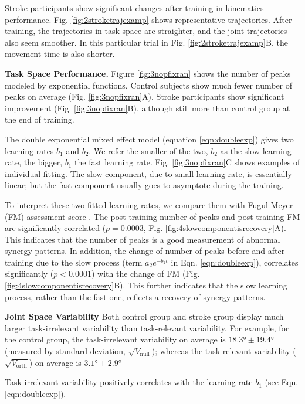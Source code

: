 Stroke participants show significant changes after training in kinematics performance.
Fig. \ref{fig:2stroketrajexamp} shows representative trajectories. After training, the trajectories in task space are straighter, and the joint trajectories also seem smoother. In this particular trial in Fig. \ref{fig:2stroketrajexamp}B, the movement time is also shorter.

\textbf{Task Space Performance.}
Figure \ref{fig:3nopfixran} shows the number of peaks modeled by exponential functions.
Control subjects show much fewer number of peaks on average (Fig. \ref{fig:3nopfixran}A).
Stroke participants show significant improvement (Fig. \ref{fig:3nopfixran}B), although still more than control group at the end of training.

The double exponential mixed effect model (equation \ref{eqn:doubleexp}) gives two learning rates $ b_1 $ and $ b_2 $. 
We refer the smaller of the two, $ b_2 $ as the slow learning rate, the bigger, $ b_1 $ the fast learning rate.
Fig. \ref{fig:3nopfixran}C shows examples of individual fitting.
The slow component, due to small learning rate, is essentially linear; but the fast component usually goes to asymptote during the training.

To interpret these two fitted learning rates, we compare them with Fugul Meyer (FM) assessment score \cite{}.
The post training number of peaks and post training FM are significantly correlated ($ p = 0.0003 $, Fig. \ref{fig:4slowcomponentisrecovery}A).
This indicates that the number of peaks is a good measurement of abnormal synergy patterns.
In addition, the change of number of peaks before and after training due to the slow process (term $ a_2e^{-b_2t} $ in Eqn. \ref{eqn:doubleexp}), correlates significantly ($ p<0.0001 $) with the change of FM (Fig. \ref{fig:4slowcomponentisrecovery}B).
This further indicates that the slow learning process, rather than the fast one, reflects a recovery of synergy patterns.

\textbf{Joint Space Variability}
Both control group and stroke group display much larger task-irrelevant variability than task-relevant variability.
For example, for the control group, the task-irrelevant variability on average is $ \ang{18.3} \pm \ang{19.4} $ (measured by standard deviation, $ \sqrt{V_\text{null}} $); whereas the task-relevant variability ($ \sqrt{V_\text{orth}} $) on average is $ \ang{3.1} \pm \ang{2.9} $

Task-irrelevant variability positively correlates with the learning rate $ b_1 $ (see Eqn. \ref{eqn:doubleexp}).



